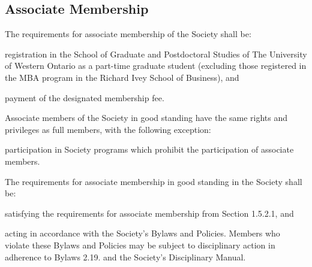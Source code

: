 \begin{longenum}[label*=\thesubsection.\arabic*., align=left]
\end{longenum}


\subsection{Associate Membership}
	\begin{longenum}[label*=\thesubsection.\arabic*., align=left]
  	\item  The requirements for associate membership of the Society shall be:
    	\begin{longenum}[label*=\arabic*., align=left]
    	\item registration in the School of Graduate and Postdoctoral Studies of The University of Western Ontario as a part-time graduate student (excluding those registered in the MBA program in the Richard Ivey School of Business), and
    	\item payment of the designated membership fee.
  	\end{longenum}
    \item Associate members of the Society in good standing have the same rights and privileges as full members, with the following exception:
    	\begin{longenum}[label*=\arabic*., align=left]
    	\item participation in Society programs which prohibit the participation of associate members.
  	\end{longenum}
    \item The requirements for associate membership in good standing in the Society shall be:
    \begin{longenum}[label*=\arabic*., align=left]
    	\item satisfying the requirements for associate membership from Section 1.5.2.1, and
        \item acting in accordance with the Society’s Bylaws and Policies. Members who violate these Bylaws and Policies may be subject to disciplinary action in adherence to Bylaws 2.19. and the Society’s Disciplinary Manual.
  	\end{longenum}
\end{longenum}

